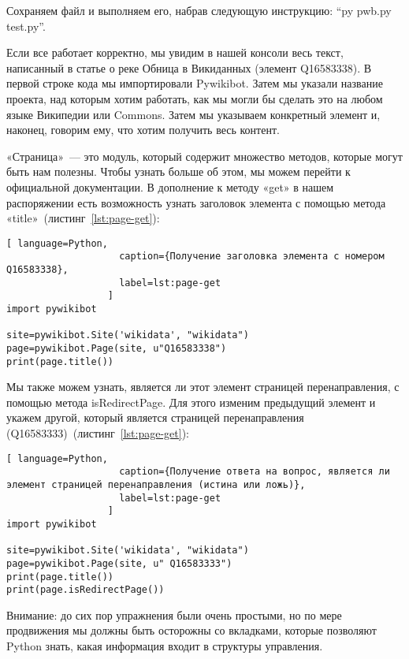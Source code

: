 Сохраняем файл и выполняем его, набрав следующую инструкцию: ``py pwb.py test.py''.

Если все работает корректно, мы увидим в нашей консоли весь текст, написанный в статье о реке Обница в Викиданных (элемент Q16583338). В первой строке кода мы импортировали Pywikibot. Затем мы указали название проекта, над которым хотим работать, как мы могли бы сделать это на любом языке Википедии или Commons. Затем мы указываем конкретный элемент и, наконец, говорим ему, что хотим получить весь контент.

«Страница»~--- это модуль, который содержит множество методов, которые могут быть нам полезны. Чтобы узнать больше об этом, мы можем перейти к официальной документации. В дополнение к методу «get» в нашем распоряжении есть возможность узнать заголовок элемента с помощью метода «title»~(листинг~\ref{lst:page-get}):

\begin{lstlisting}[ language=Python,
                    caption={Получение заголовка элемента с номером Q16583338},
                    label=lst:page-get
                  ]
import pywikibot

site=pywikibot.Site('wikidata', "wikidata")
page=pywikibot.Page(site, u"Q16583338")
print(page.title())
\end{lstlisting}

Мы также можем узнать, является ли этот элемент страницей перенаправления, с помощью метода isRedirectPage. Для этого изменим предыдущий элемент и укажем другой, который является страницей перенаправления (Q16583333)~(листинг~\ref{lst:page-get}):

\begin{lstlisting}[ language=Python,
                    caption={Получение ответа на вопрос, является ли элемент страницей перенаправления (истина или ложь)},
                    label=lst:page-get
                  ]
import pywikibot

site=pywikibot.Site('wikidata', "wikidata")
page=pywikibot.Page(site, u" Q16583333")
print(page.title())
print(page.isRedirectPage())
\end{lstlisting}

Внимание: до сих пор упражнения были очень простыми, но по мере продвижения мы должны быть осторожны со вкладками, которые позволяют Python знать, какая информация входит в структуры управления.

